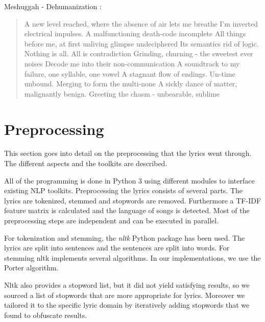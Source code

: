 \documentclass[10pt,a4paper]{article}
\begin{document}
	Meshuggah - Dehumanization : 
	\begin{quote}
	A new level reached, where the absence of air lets me breathe  \newline
	I'm inverted electrical impulses. A malfunctioning death-code incomplete  \newline
	All things before me, at first unliving glimpse undeciphered  \newline
	Its semantics rid of logic. Nothing is all. All is contradiction  \newline
	Grinding, churning - the sweetest ever noises  \newline
	Decode me into their non-communication  \newline
	A soundtrack to my failure, one syllable, one vowel  \newline
	A stagnant flow of endings. Un-time unbound. Merging to form the multi-none \newline
	A sickly dance of matter, malignantly benign. Greeting the chasm - unbearable, sublime \newline
	\end{quote}

	\section{Preprocessing}	
	\label{sec:preprocessing}
	This section goes into detail on the preprocessing that the lyrics went through. The different aspects and the toolkits are described. %
	
	All of the programming is done in Python 3 using different modules to interface existing NLP toolkits. Preprocessing the lyrics consists of several parts. The lyrics are tokenized, stemmed and stopwords are removed. Furthermore a TF-IDF feature matrix is calculated and the language of songs is detected. Most of the preprocessing steps are independent and can be executed in parallel. 
	
	For tokenization and stemming, the \textit{nltk} Python package \cite{nltk} has been used. The lyrics are split into sentences and the sentences are split into words. For stemming nltk implements several algorithms. In our implementations, we use the Porter algorithm.  
	
	Nltk also provides a stopword list, but it did not yield satisfying results, so we sourced a list of stopwords that are more appropriate for lyrics. Moreover we tailored it to the specific lyric domain by iteratively adding stopwords that we found to obfuscate results.
	
\end{document}
